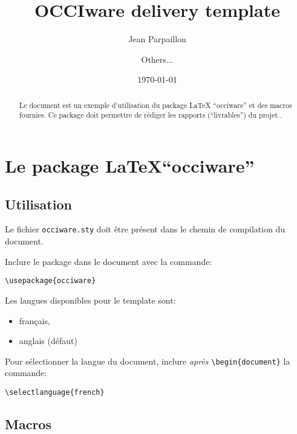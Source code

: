 \documentclass[a4paper,11pt,twoside]{report}
\begin{document}

\title{OCCIware delivery template}
\author{
  Jean Parpaillon
  \and Others...}
\date{\today}

\maketitle

\begin{abstract}
  Le document est un exemple d'utilisation du package \LaTeX
  ``occiware'' et des macros fournies. Ce package doit permettre de
  rédiger les rapports (``livrables'') du projet \occiware.
\end{abstract}

\chapter{Le package \LaTeX ``occiware''}
\label{chap:one}

\section{Utilisation}
\label{sec:utilisation}

Le fichier \texttt{occiware.sty} doit être présent dans le chemin de
compilation du document.

Inclure le package dans le document avec la commande:

\begin{verbatim}
\usepackage{occiware}
\end{verbatim}

Les langues disponibles pour le template sont:
\begin{itemize}
\item français,
\item anglais (défaut)
\end{itemize}

Pour sélectionner la langue du document, inclure \emph{après}
  \verb+\begin{document}+ la commande:

\begin{verbatim}
\selectlanguage{french}
\end{verbatim}

\section{Macros}
\label{sec:macros}
\end{document}
